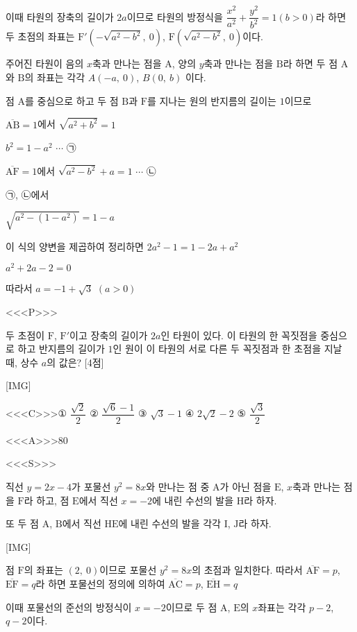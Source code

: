 \documentclass{oblivoir}
\begin{document}
이때 타원의 장축의 길이가 $2a$이므로 타원의 방정식을 $\dfrac{x^{2}}{a^{2}}+\dfrac{y^{2}}{b^{2}}=1$$(b>0)$라 하면 두 초점의 좌표는 $\mathrm{F}'(-\sqrt{a^{2}-b^{2}},\: 0)$, $\mathrm{F}(\sqrt{a^{2}-b^{2}},\: 0)$이다.

주어진 타원이 음의 $x$축과 만나는 점을 $\mathrm{A}$, 양의 $y$축과 만나는 점을 $\mathrm{B}$라 하면 두 점 $\mathrm{A}$와 $\mathrm{B}$의 좌표는 각각 $A(-a,\:0)$, $B(0,\: b)$ 이다.

점 $\mathrm{A}$를 중심으로 하고 두 점 $\mathrm{B}$과 $\mathrm{F}$를 지나는 원의 반지름의 길이는  $1$이므로

$\overline{\mathrm{AB}}=1$에서 $\sqrt{a^{2}+b^{2}}=1$

$b^{2}=1-a^{2}$ $\cdots$ ㉠

$\overline{\mathrm{AF}}=1$에서 $\sqrt{a^{2}-b^{2}}+a=1$ $\cdots$ ㉡

㉠, ㉡에서

$\sqrt{a^{2}-(1-a^{2})}=1-a$

이 식의 양변을 제곱하여 정리하면 $2a^{2}-1=1-2a+a^{2}$

$a^{2}+2a-2=0$

따라서 $a=-1+\sqrt{3}$ $(a>0)$

<<<P>>>

두 초점이 $\mathrm{F}$, $\mathrm{F}'$이고 장축의 길이가  $2a$인 타원이 있다. 이 타원의 한 꼭짓점을 중심으로 하고 반지름의 길이가 $1$인 원이 이 타원의 서로 다른 두 꼭짓점과 한 초점을 지날 때, 상수 $a$의 값은? [4점]

[IMG]

<<<C>>>① $\dfrac{\sqrt{2}}{2}$ ② $\dfrac{\sqrt{6}-1}{2}$ ③ $\sqrt{3}-1$ ④ $2\sqrt{2}-2$ ⑤ $\dfrac{\sqrt{3}}{2}$

<<<A>>>$80$

<<<S>>>

직선 $y = 2x - 4$가 포물선 $y^{2}= 8x$와 만나는 점 중 $\mathrm{A}$가 아닌 점을 $\mathrm{E}$, $x$축과 만나는 점을 $\mathrm{F}$라 하고, 점 $\mathrm{E}$에서 직선 $x = -2$에 내린 수선의 발을 $\mathrm{H}$라 하자.

또 두 점 $\mathrm{A}$, $\mathrm{B}$에서 직선 $\mathrm{HE}$에 내린 수선의 발을 각각 $\mathrm{I}$, $\mathrm{J}$라 하자.

[IMG]

점 $\mathrm{F}$의 좌표는 $(2,\:0)$이므로 포물선 $y^{2}= 8x$의 초점과 일치한다. 따라서 $\overline{\mathrm{AF}} = p$, $\overline{\mathrm{EF}} = q$라 하면 포물선의 정의에 의하여 $\overline{\mathrm{AC}} = p$, $\overline{\mathrm{EH}} = q$

이때 포물선의 준선의 방정식이 $x = -2$이므로 두 점 $\mathrm{A}$, $\mathrm{E}$의 $x$좌표는 각각 $p-2$, $q-2$이다. 
\end{document}
